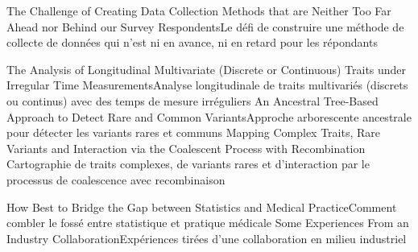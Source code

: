 
{
}
{The Challenge of Creating Data Collection Methods that are Neither Too Far Ahead nor Behind our Survey Respondents}{Le défi de construire une méthode de collecte de données qui n'est ni en avance, ni en retard pour les répondants}
{\bubbleE \enspace \screenB}


{
}
{The Analysis of Longitudinal Multivariate (Discrete or Continuous) Traits under Irregular Time Measurements}{Analyse longitudinale de traits multivariés (discrets ou continus) avec des temps de mesure irréguliers}
{\bubbleE \enspace \screenE}
{
}
{An Ancestral Tree-Based Approach to Detect Rare and Common Variants}{Approche arborescente ancestrale pour détecter les variants rares et communs}
{\bubbleE \enspace \screenE}
{
}
{Mapping Complex Traits, Rare Variants and Interaction via the Coalescent Process with Recombination }{Cartographie de traits complexes, de variants rares et d’interaction par le processus de coalescence avec recombinaison}
{\bubbleE \enspace \screenE}


{
}
{How Best to Bridge the Gap between Statistics and Medical Practice}{Comment combler le fossé entre statistique et pratique médicale}
{\bubbleE \enspace \screenE}
{
}
{Some Experiences From an Industry Collaboration}{Expériences tirées d’une collaboration en milieu industriel }
{\bubbleE \enspace \screenE}

